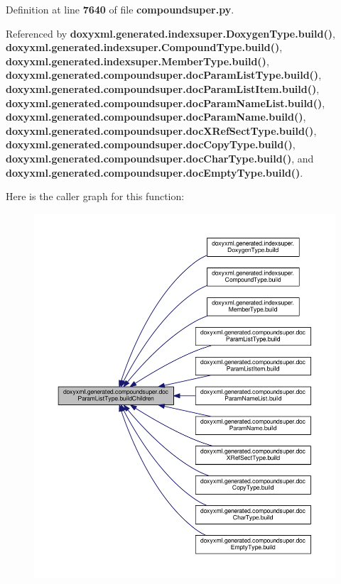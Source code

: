 Definition at line {\bf 7640} of file {\bf compoundsuper.\+py}.



Referenced by {\bf doxyxml.\+generated.\+indexsuper.\+Doxygen\+Type.\+build()}, {\bf doxyxml.\+generated.\+indexsuper.\+Compound\+Type.\+build()}, {\bf doxyxml.\+generated.\+indexsuper.\+Member\+Type.\+build()}, {\bf doxyxml.\+generated.\+compoundsuper.\+doc\+Param\+List\+Type.\+build()}, {\bf doxyxml.\+generated.\+compoundsuper.\+doc\+Param\+List\+Item.\+build()}, {\bf doxyxml.\+generated.\+compoundsuper.\+doc\+Param\+Name\+List.\+build()}, {\bf doxyxml.\+generated.\+compoundsuper.\+doc\+Param\+Name.\+build()}, {\bf doxyxml.\+generated.\+compoundsuper.\+doc\+X\+Ref\+Sect\+Type.\+build()}, {\bf doxyxml.\+generated.\+compoundsuper.\+doc\+Copy\+Type.\+build()}, {\bf doxyxml.\+generated.\+compoundsuper.\+doc\+Char\+Type.\+build()}, and {\bf doxyxml.\+generated.\+compoundsuper.\+doc\+Empty\+Type.\+build()}.



Here is the caller graph for this function\+:
\nopagebreak
\begin{figure}[H]
\begin{center}
\leavevmode
\includegraphics[width=350pt]{d2/d0c/classdoxyxml_1_1generated_1_1compoundsuper_1_1docParamListType_a07efbe8f4aae6d4db4a92a25e3b1e939_icgraph}
\end{center}
\end{figure}



